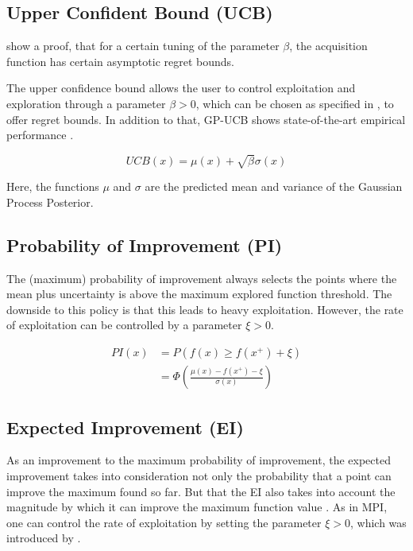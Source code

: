 \subsection{Upper Confident Bound (UCB)}
\citep{UCBRegretProof} show a proof, that for a certain tuning of the parameter $\beta$, the acquisition function has certain asymptotic regret bounds.

The upper confidence bound allows the user to control exploitation and exploration through a parameter $\beta > 0$, which can be chosen as specified in \citep{UCBRegretProof} , to offer regret bounds.
In addition to that, GP-UCB shows state-of-the-art empirical performance \citep{Djolonga2013}.

\begin{equation}
UCB(x) = \mu(x) + \sqrt{ \beta } \sigma(x)
\end{equation}

Here, the functions $\mu$ and $\sigma$ are the predicted mean and variance of the Gaussian Process Posterior.

\subsection{Probability of Improvement (PI)}
The (maximum) probability of improvement \citep{AcquisitionFunctions} always selects the points where the mean plus uncertainty is above the maximum explored function threshold. 
The downside to this policy is that this leads to heavy exploitation.
However, the rate of exploitation can be controlled by a parameter $\xi > 0$.

\begin{align}
    PI(x) & = P( f(x) \geq f(x^+) + \xi ) \\
    & = \Phi ( \frac{\mu(x) - f(x^+) - \xi}{\sigma(x)}  ) 
\end{align}


\subsection{Expected Improvement (EI)}
As an improvement to the maximum probability of improvement, the expected improvement takes into consideration not only the probability that a point can improve the maximum found so far.
But that the EI also takes into account the magnitude by which it can improve the maximum function value \citep{AcquisitionFunctions}.
As in MPI, one can control the rate of exploitation by setting the parameter $\xi > 0$, which was introduced by \citep{Lizotte2008}.

